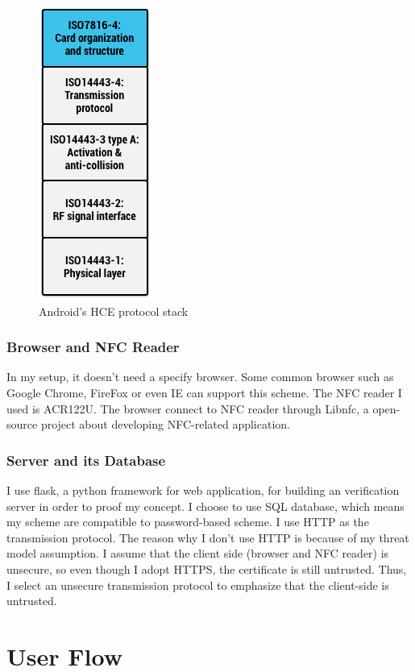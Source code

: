 \begin{CJK}{Bg5}{bsmi}
\begin{figure}
\centering
\includegraphics[scale=0.7]{picture/protocol-stack.png}
\caption{Android's HCE protocol stack\cite{nfc-hce-stack}}
\label{fig:protocol-stack}
\end{figure}

\subsubsection{Browser and NFC Reader}
In my setup, it doesn't need a specify browser. Some common browser such as Google Chrome, FireFox or even IE can support this scheme. The NFC reader I used is ACR122U. The browser connect to NFC reader through Libnfc\cite{libnfc}, a open-source project about developing NFC-related application.

\subsubsection{Server and its Database}

I use flask, a python framework for web application, for building an verification server in order to proof my concept. I choose to use SQL database, which means my scheme are compatible to password-based scheme. I use HTTP as the transmission protocol. The reason why I don't use HTTP is because of my threat model assumption. I assume that the client side (browser and NFC reader) is unsecure, so even though I adopt HTTPS, the certificate is still untrusted. Thus, I select an unsecure transmission protocol to emphasize that the client-side is untrusted.

\section{User Flow}


\end{CJK}
